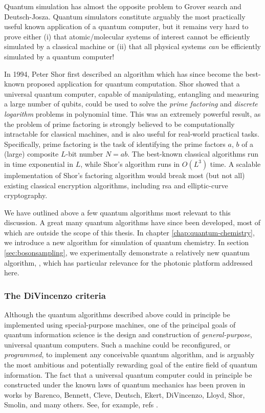 Quantum simulation has almost the opposite problem to Grover search and Deutsch-Josza. Quantum simulators constitute arguably the most practically useful known application of a quantum computer, but it remains very hard to prove either (i) that atomic/molecular systems of interest cannot be efficiently simulated by a classical machine or (ii) that all physical systems \emph{can} be efficiently simulated by a quantum computer!

In 1994, Peter Shor first described an algorithm \cite{Shor1994} which has since become the best-known proposed application for quantum computation. Shor showed that a universal quantum computer, capable of manipulating, entangling and measuring a large number of qubits, could be used to solve the \emph{prime factoring} and \emph{discrete logarithm} problems in polynomial time. This was an extremely powerful result, as the problem of prime factoring is strongly believed to be computationally intractable for classical machines, and is also useful for real-world practical tasks. Specifically, prime factoring is the task of identifying the prime factors $a$, $b$ of a (large) composite $L$-bit number $N=ab$. The best-known classical algorithms run in time exponential in $L$, while Shor's algorithm runs in $O(L^3)$ time. A scalable implementation of Shor's factoring algorithm would break most (but not all) existing classical encryption algorithms, including \gls{rsa} and elliptic-curve cryptography.

We have outlined above a few quantum algorithms most relevant to this discussion. A great many quantum algorithms have since been developed, most of which are outside the scope of this thesis. In chapter \ref{chap:quantum-chemistry}, we introduce a new algorithm for simulation of quantum chemistry. In section \ref{sec:bosonsampling}, we experimentally demonstrate a relatively new quantum algorithm, \bosonsampling, which has particular relevance for the photonic platform addressed here.

\subsubsection{The DiVincenzo criteria} 
\label{sec:divincenzo-criteria}
Although the quantum algorithms described above could in principle be implemented using special-purpose machines, one of the principal goals of quantum information science is the design and construction of \emph{general-purpose}, universal quantum computers. Such a machine could be reconfigured, or \emph{programmed}, to implement any conceivable quantum algorithm, and is arguably the most ambitious and potentially rewarding goal of the entire field of quantum information. The fact that a universal quantum computer could in principle be constructed under the known laws of quantum mechanics has been proven in works by Barenco, Bennett, Cleve, Deutsch, Ekert, DiVincenzo, Lloyd, Shor, Smolin, and many others. See, for example, refs \cite{DiVincenzo1995, Barenco1995, Lloyd1995a, Boykin1999}.

